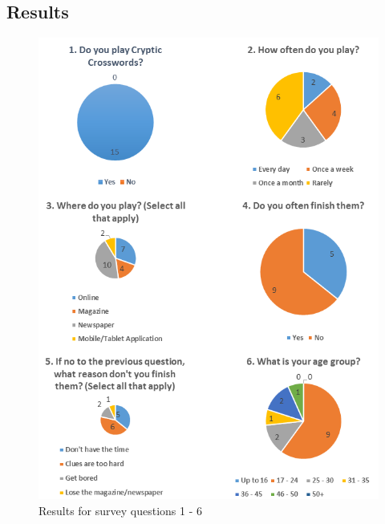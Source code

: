 \subsection{Results}
\begin{figure}[H]
\begin{center}
\includegraphics[keepaspectratio=true]
	{problem_analysis/graphs_1_6.png}
\caption{Results for survey questions 1 - 6}
\end{center}
\end{figure}

